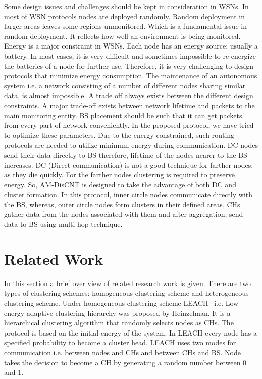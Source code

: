 \documentclass[journal]{IEEEtran}
\begin{document}
 Some design issues and challenges should be kept in consideration in WSNs. In most of WSN protocols nodes are deployed randomly. Random deployment in larger areas leaves some regions unmonitored. Which is a fundamental issue in random deployment. It reflects how well an environment is being monitored.
 Energy is a major constraint in WSNs. Each node has an energy source; usually a battery. In most cases, it is very difficult and sometimes impossible to re-energize the batteries of a node for further use. Therefore, it is very challenging to design protocols that minimize energy consumption.  The maintenance of an autonomous system i.e. a network consisting of a number of different nodes sharing similar data, is almost impossible. A trade off always exists between the different design constraints. A major trade-off exists between network lifetime and packets to the main monitoring entity. BS placement should be such that it can get packets from every part of network conveniently. In the proposed protocol, we have tried to optimize these parameters. Due to the energy constrained, such routing protocols are needed to utilize minimum energy during communication. DC nodes send their data directly to BS therefore, lifetime of the nodes nearer to the BS increases. DC (Direct communication) is not a good technique for farther nodes, as they die quickly. For the farther nodes clustering is required to preserve energy. So, AM-DisCNT is designed to take the advantage of both DC and cluster formation. In this protocol, inner circle nodes communicate directly with the BS, whereas, outer circle nodes form clusters in their defined areas. CHs gather data from the nodes associated with them and after aggregation, send data to BS using multi-hop technique.

\section{Related Work}
 In this section a brief over view of related research work is given.
 There are two types of clustering schemes: homogeneous clustering scheme and heterogeneous clustering scheme.
 Under homogeneous clustering scheme LEACH~\cite{1} i.e. Low energy adaptive clustering hierarchy was proposed by Heinzelman. It is a hierarchical clustering algorithm that randomly selects nodes as CHs. The protocol is based on the initial energy of the system.  In LEACH every node has a specified probability to become a cluster head. LEACH uses two modes for communication i.e. between nodes and CHs and between CHs and BS. Node takes the decision to become a CH by generating a random number between 0 and 1.
\end{document}
